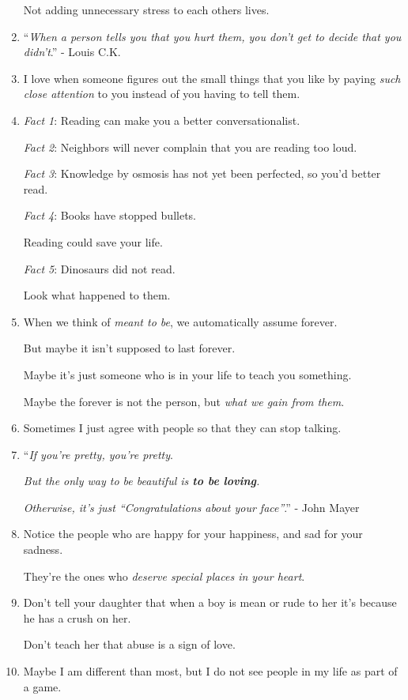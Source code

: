 \documentclass{article}
\begin{document}
\begin{enumerate}
	Not adding unnecessary stress to each others lives.
	\item ``\textit{When a person tells you that you hurt them, you don't get to decide that you didn't}.'' - Louis C.K.
	\item I love when someone figures out the small things that you like by paying \textit{such close attention} to you instead of you having to tell them.
	\item \textit{Fact 1}: Reading can make you a better conversationalist.
	
	\textit{Fact 2}: Neighbors will never complain that you are reading too loud.
	
	\textit{Fact 3}: Knowledge by osmosis has not yet been perfected, so you'd better read.
	
	\textit{Fact 4}: Books have stopped bullets.
	
	Reading could save your life.
	
	\textit{Fact 5}: Dinosaurs did not read.
	
	Look what happened to them.
	\item When we think of \textit{meant to be}, we automatically assume forever.
	
	But maybe it isn't supposed to last forever.
	
	Maybe it's just someone who is in your life to teach you something.
	
	Maybe the forever is not the person, but \textit{what we gain from them}.
	\item Sometimes I just agree with people so that they can stop talking.
	\item ``\textit{If you're pretty, you're pretty}.
	
	\textit{But the only way to be beautiful is \textbf{to be loving}.}
	
	\textit{Otherwise, it's just ``Congratulations about your face''}.'' - John Mayer
	\item Notice the people who are happy for your happiness, and sad for your sadness.
	
	They're the ones who \textit{deserve special places in your heart}.
	\item Don't tell your daughter that when a boy is mean or rude to her it's because he has a crush on her.
	
	Don't teach her that abuse is a sign of love.
	\item Maybe I am different than most, but I do not see people in my life as part of a game.
	

\end{enumerate}
\end{document}
